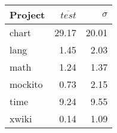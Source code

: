 \begin{tabular}{ l | r r}
\hline 
\textbf{Project} & \textbf{$\overline{test}$} & \textbf{$\sigma$} \\ 
\hline 
chart  &  29.17  &  20.01\\ 
lang  &  1.45  &  2.03\\ 
math  &  1.24  &  1.37\\ 
mockito  &  0.73  &  2.15\\ 
time  &  9.24  &  9.55\\ 
xwiki  &  0.14  &  1.09\\ 
\end{tabular}